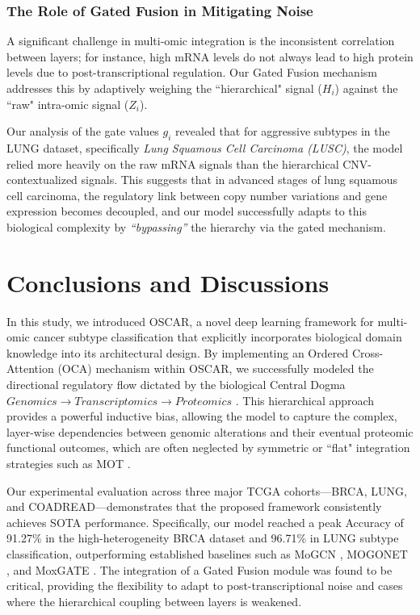 \documentclass[lettersize,journal]{IEEEtran}
\begin{document}
\subsubsection{The Role of Gated Fusion in Mitigating Noise}
A significant challenge in multi-omic integration is the inconsistent correlation between layers; for instance, high mRNA levels do not always lead to high protein levels due to post-transcriptional regulation. Our Gated Fusion mechanism addresses this by adaptively weighing the ``hierarchical" signal ($H_i$) against the ``raw" intra-omic signal ($Z_i$). 

Our analysis of the gate values $g_i$ revealed that for aggressive subtypes in the LUNG dataset, specifically \textit{Lung Squamous Cell Carcinoma (LUSC)}, the model relied more heavily on the raw mRNA signals than the hierarchical CNV-contextualized signals. This suggests that in advanced stages of lung squamous cell carcinoma, the regulatory link between copy number variations and gene expression becomes decoupled, and our model successfully adapts to this biological complexity by \textit{``bypassing''} the hierarchy via the gated mechanism.

\section{Conclusions and Discussions}

In this study, we introduced OSCAR, a novel deep learning framework for multi-omic cancer subtype classification that explicitly incorporates biological domain knowledge into its architectural design. By implementing an Ordered Cross-Attention (OCA) mechanism within OSCAR, we successfully modeled the directional regulatory flow dictated by the biological Central Dogma  $Genomics  \rightarrow Transcriptomics \rightarrow Proteomics$ . This hierarchical approach provides a powerful inductive bias, allowing the model to capture the complex, layer-wise dependencies between genomic alterations and their eventual proteomic functional outcomes, which are often neglected by symmetric or ``flat" integration strategies such as MOT \cite{MOT2023}.

Our experimental evaluation across three major TCGA cohorts—BRCA, LUNG, and COADREAD—demonstrates that the proposed framework consistently achieves SOTA performance. Specifically, our model reached a peak Accuracy of 91.27\% in the high-heterogeneity BRCA dataset and 96.71\% in LUNG subtype classification, outperforming established baselines such as MoGCN \cite{MoGCN2022}, MOGONET \cite{MOGONET2021}, and MoxGATE \cite{MoxGATE2023}. The integration of a Gated Fusion module was found to be critical, providing the flexibility to adapt to post-transcriptional noise and cases where the hierarchical coupling between layers is weakened.
\end{document}
